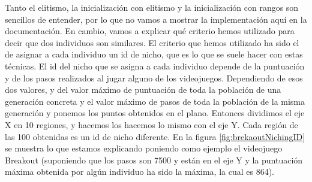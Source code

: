 \newpage

Tanto el elitismo, la inicialización con elitismo y la inicialización con rangos son sencillos de entender, por lo que no vamos a mostrar la implementación aquí en la documentación. En cambio, vamos a explicar qué criterio hemos utilizado para decir que dos individuos son similares. El criterio que hemos utilizado ha sido el de asignar a cada individuo un id de nicho, que es lo que se suele hacer con estas técnicas. El id del nicho que se asigna a cada individuo depende de la puntuación y de los pasos realizados al jugar alguno de los videojuegos. Dependiendo de esos dos valores, y del valor máximo de puntuación de toda la población de una generación concreta y el valor máximo de pasos de toda la población de la misma generación y ponemos los puntos obtenidos en el plano. Entonces dividimos el eje X en 10 regiones, y hacemos los hacemos lo mismo con el eje Y. Cada región de las 100 obtenidas es un id de nicho diferente. En la figura \ref{fig:brekaoutNichingID} se muestra lo que estamos explicando poniendo como ejemplo el videojuego Breakout (suponiendo que los pasos son 7500 y están en el eje Y y la puntuación máxima obtenida por algún individuo ha sido la máxima, la cual es 864).

